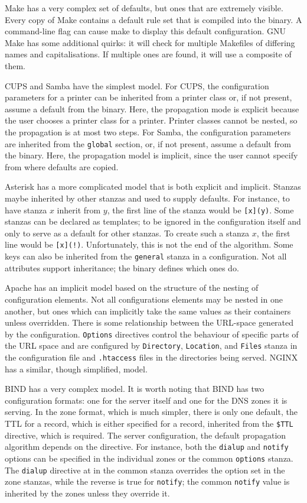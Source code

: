 \documentclass[letterpaper,twocolumn,10pt]{article}
\begin{document}
Make has a very complex set of defaults, but ones that are extremely visible. Every copy of Make contains a default rule set that is compiled into the binary. A command-line flag can cause make to display this default configuration. GNU Make has some additional quirks: it will check for multiple Makefiles of differing names and capitalisations. If multiple ones are found, it will use a composite of them.\cite{make}

CUPS and Samba have the simplest model. For CUPS, the configuration parameters for a printer can be inherited from a printer class or, if not present, assume a default from the binary.\cite{cups} Here, the propagation mode is explicit because the user chooses a printer class for a printer. Printer classes cannot be nested, so the propagation is at most two steps. For Samba, the configuration parameters are inherited from the \texttt{global} section, or, if not present, assume a default from the binary.\cite{samba} Here, the propagation model is implicit, since the user cannot specify from where defaults are copied.

Asterisk has a more complicated model that is both explicit and implicit. Stanzas maybe inherited by other stanzas and used to supply defaults. For instance, to have stanza $x$ inherit from $y$, the first line of the stanza would be \verb![x](y)!. Some stanzas can be declared as templates; to be ignored in the configuration itself and only to serve as a default for other stanzas. To create such a stanza $x$, the first line would be \verb#[x](!)#. Unfortunately, this is not the end of the algorithm. Some keys can also be inherited from the \texttt{general} stanza in a configuration. Not all attributes support inheritance; the binary defines which ones do.

Apache has an implicit model based on the structure of the nesting of configuration elements. Not all configurations elements may be nested in one another, but ones which can implicitly take the same values as their containers unless overridden. There is some relationship between the URL-space generated by the configuration. \texttt{Options} directives control the behaviour of specific parts of the URL space and are configured by \texttt{Directory}, \texttt{Location}, and \texttt{Files} stanza in the configuration file and \verb!.htaccess! files in the directories being served.\cite{apache} NGINX has a similar, though simplified, model.\cite{nginx}

BIND has a very complex model. It is worth noting that BIND has two configuration formats: one for the server itself and one for the DNS zones it is serving. In the zone format, which is much simpler, there is only one default, the TTL for a record, which is either specified for a record, inherited from the \texttt{\$TTL} directive, which is required. The server configuration, the default propagation algorithm depends on the directive. For instance, both the \texttt{dialup}  and \texttt{notify} options can be specified in the individual zones or the common \texttt{options} stanza. The \texttt{dialup} directive at in the common stanza overrides the option set in the zone stanzas, while the reverse is true for \texttt{notify}; the common \texttt{notify} value is inherited by the zones unless they override it.\cite{bind}
\end{document}
